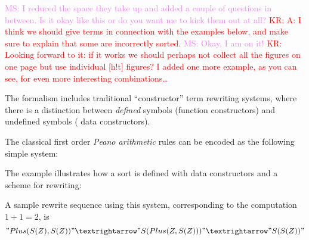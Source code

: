 \documentclass[letterpaper,11pt]{article}
\newcommand{\KR}[1]{\textcolor{red}{KR: #1}}
\newcommand{\MS}[1]{\textcolor{violet}{MS: #1}}
\begin{document}
\MS{I reduced the space they take up and added a couple of questions in between. Is it okay like
  this or do you want me to kick them out at all?}  \KR{A: I think we should give terms in
  connection with the examples below, and make sure to explain that some are incorrectly sorted.}
\MS{Okay, I am on it!} \KR{Looking forward to it: if it works we should perhaps not collect all the
  figures on one page but use individual [h!t] figures? I added one more example, as you can see, for
even more interesting combinations…}

The \hax formalism includes traditional ``constructor'' term rewriting systems, where there is a
distinction between \emph{defined} symbols (\hax function constructors) and undefined symbols (\hax
data constructors).

\begin{example}\label{ex:peano}
  The classical first order \emph{Peano arithmetic} rules can be encoded as the following simple
  \hax system:
  The example illustrates how a sort is defined with data constructors and a scheme for
  rewriting:
  A sample rewrite sequence using this system, corresponding to the computation $1+1=2$, is
  \begin{displaymath}
    "Plus(S(Z), S(Z))" →
    "S(Plus(Z, S(Z)))" →
    "S(S(Z))"
  \end{displaymath}
\end{example}
\end{document}
